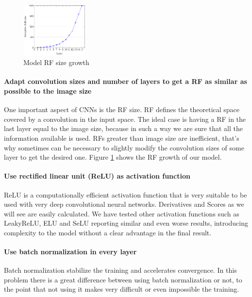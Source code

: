 \documentclass[preprint]{elsarticle}
\theoremstyle{definition} %
\theoremstyle{remark}
\begin{document}
\begin{figure}
	\centering
	\includegraphics[width=0.30\textwidth]{figures/receptive-field-640.pdf}
	\caption{Model RF size growth}
	\label{fig:rf_graph}
\end{figure}

\paragraph{Adapt convolution sizes and number of layers to get a RF as similar as possible to the image size} One important aspect of CNNs is the RF size. RF defines the theoretical space covered by a convolution in the input space. The ideal case is having a RF in the last layer equal to the image size, because in such a way we are sure that all the information available is used. RFs greater than image size are inefficient, that's why sometimes can be necessary to slightly modify the convolution sizes of some layer to get the desired one. Figure \ref{fig:rf_graph} shows the RF growth of our model.

\paragraph{Use rectified linear unit (ReLU) as activation function} ReLU is a computationally efficient activation function that is very suitable to be used with very deep convolutional neural networks\citep{Dahl2013}. Derivatives and Scores as we will see are easily calculated. We have tested other activation functions such as LeakyReLU, ELU and SeLU reporting similar and even worse results, introducing complexity to the model without a clear advantage in the final result.

\paragraph{Use batch normalization in every layer} Batch normalization \citep{batch-norm} stabilize the training and accelerates convergence. In this problem there is a great difference between using batch normalization or not, to the point that not using it makes very difficult or even impossible the training.
\end{document}
